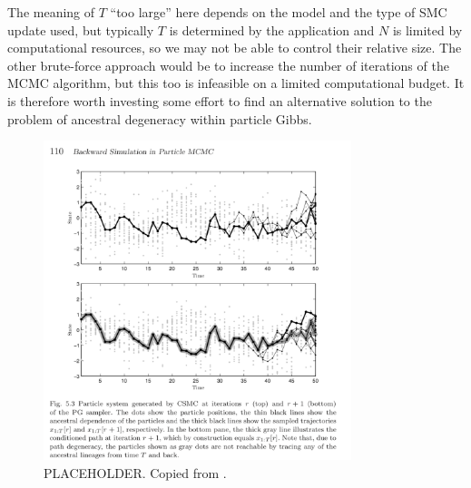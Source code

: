 The meaning of $T$ ``too large'' here depends on the model and the type of SMC update used, but typically $T$ is determined by the application and $N$ is limited by computational resources, so we may not be able to control their relative size. The other brute-force approach would be to increase the number of iterations of the MCMC algorithm, but this too is infeasible on a limited computational budget.
It is therefore worth investing some effort to find an alternative solution to the problem of ancestral degeneracy within particle Gibbs.


\begin{figure}
\centering
\includegraphics[width=0.8\textwidth]{plots/lindsten_figure.png}
\caption{PLACEHOLDER. Copied from \textcite{lindsten2013}.}
\label{fig:PG_ancdegen}
\end{figure}

